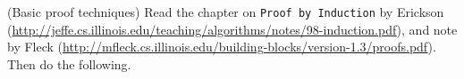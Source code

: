 \begin{questions}
  \question (Basic proof techniques) Read the chapter on \texttt{Proof
    by Induction} by Erickson
  (\url{http://jeffe.cs.illinois.edu/teaching/algorithms/notes/98-induction.pdf}),
  and note by Fleck
  (\url{http://mfleck.cs.illinois.edu/building-blocks/version-1.3/proofs.pdf}). Then
  do the following.


  \newpage

\end{questions}



